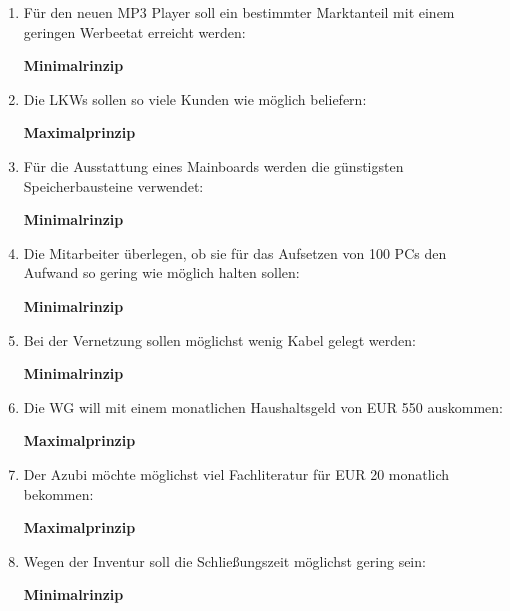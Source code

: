 \documentclass[a4paper,11pt]{scrartcl}		%
\begin{document}
		\begin{enumerate}
			\item Für den neuen MP3 Player soll ein bestimmter Marktanteil mit einem geringen Werbeetat erreicht
				werden:\par
				\textbf{Minimalrinzip}
			\item Die LKWs sollen so viele Kunden wie möglich beliefern:\par
				\textbf{Maximalprinzip}
			\item Für die Ausstattung eines Mainboards werden die günstigsten Speicherbausteine verwendet:\par
				\textbf{Minimalrinzip}
			\item Die Mitarbeiter überlegen, ob sie für das Aufsetzen von 100 PCs den Aufwand so gering wie möglich
				halten sollen:\par
				\textbf{Minimalrinzip}
			\item Bei der Vernetzung sollen möglichst wenig Kabel gelegt werden:\par
				\textbf{Minimalrinzip}
			\item Die WG will mit einem monatlichen Haushaltsgeld von EUR 550 auskommen:\par
				\textbf{Maximalprinzip}
			\item Der Azubi möchte möglichst viel Fachliteratur für EUR 20 monatlich bekommen:\par
				\textbf{Maximalprinzip}
			\item Wegen der Inventur soll die Schließungszeit möglichst gering sein:\par
				\textbf{Minimalrinzip}
		\end{enumerate}
\end{document}
